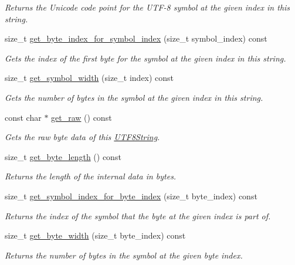 \begin{DoxyCompactItemize}
\begin{DoxyCompactList}\small\item\em Returns the Unicode code point for the U\-T\-F-\/8 symbol at the given index in this string. \end{DoxyCompactList}\item 
size\-\_\-t \hyperlink{classchaos_1_1uni_1_1_u_t_f8_string_a54d7b7377d4f22b593dc072e8e929529}{get\-\_\-byte\-\_\-index\-\_\-for\-\_\-symbol\-\_\-index} (size\-\_\-t symbol\-\_\-index) const 
\begin{DoxyCompactList}\small\item\em Gets the index of the first byte for the symbol at the given index in this string. \end{DoxyCompactList}\item 
size\-\_\-t \hyperlink{classchaos_1_1uni_1_1_u_t_f8_string_af69ae3c678c01e516d9da2cdca745613}{get\-\_\-symbol\-\_\-width} (size\-\_\-t index) const 
\begin{DoxyCompactList}\small\item\em Gets the number of bytes in the symbol at the given index in this string. \end{DoxyCompactList}\item 
const char $\ast$ \hyperlink{classchaos_1_1uni_1_1_u_t_f8_string_a91d3bb4cfbfb573b3fa6ecf3312f4dee}{get\-\_\-raw} () const 
\begin{DoxyCompactList}\small\item\em Gets the raw byte data of this \hyperlink{classchaos_1_1uni_1_1_u_t_f8_string}{U\-T\-F8\-String}. \end{DoxyCompactList}\item 
size\-\_\-t \hyperlink{classchaos_1_1uni_1_1_u_t_f8_string_ac8a4220ca85f798c27396666b2568c95}{get\-\_\-byte\-\_\-length} () const 
\begin{DoxyCompactList}\small\item\em Returns the length of the internal data in bytes. \end{DoxyCompactList}\item 
size\-\_\-t \hyperlink{classchaos_1_1uni_1_1_u_t_f8_string_a2a1f26752cfc6d5c9b14e491f2998051}{get\-\_\-symbol\-\_\-index\-\_\-for\-\_\-byte\-\_\-index} (size\-\_\-t byte\-\_\-index) const 
\begin{DoxyCompactList}\small\item\em Returns the index of the symbol that the byte at the given index is part of. \end{DoxyCompactList}\item 
size\-\_\-t \hyperlink{classchaos_1_1uni_1_1_u_t_f8_string_a7aa47a33f1886febf642c05ac51a433e}{get\-\_\-byte\-\_\-width} (size\-\_\-t byte\-\_\-index) const 
\begin{DoxyCompactList}\small\item\em Returns the number of bytes in the symbol at the given byte index. \end{DoxyCompactList}\end{DoxyCompactItemize}
